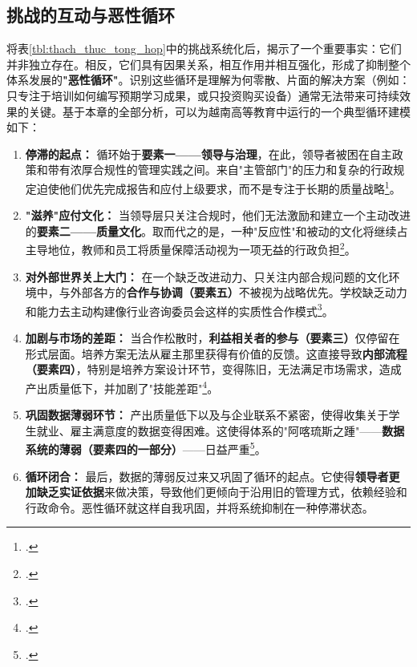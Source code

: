 \subsection{挑战的互动与恶性循环}
\label{subsec:vong_lap_luan_quan}

将表\ref{tbl:thach_thuc_tong_hop}中的挑战系统化后，揭示了一个重要事实：它们并非独立存在。相反，它们具有因果关系，相互作用并相互强化，形成了抑制整个体系发展的\textbf{"恶性循环"}。识别这些循环是理解为何零散、片面的解决方案（例如：只专注于培训如何编写预期学习成果，或只投资购买设备）通常无法带来可持续效果的关键。基于本章的全部分析，可以为越南高等教育中运行的一个典型循环建模如下：

\begin{enumerate}
    \item \textbf{停滞的起点：} 循环始于\textbf{要素一——领导与治理}，在此，领导者被困在自主政策和带有浓厚合规性的管理实践之间。来自"主管部门"的压力和复杂的行政规定迫使他们优先完成报告和应付上级要求，而不是专注于长期的质量战略\footcite{lypham_aosat_2024}。

    \item \textbf{"滋养"应付文化：} 当领导层只关注合规时，他们无法激励和建立一个主动改进的\textbf{要素二——质量文化}。取而代之的是，一种"反应性"和被动的文化将继续占主导地位，教师和员工将质量保障活动视为一项无益的行政负担\footcite{vjol_reactiveculture_2021}。
    
    \item \textbf{对外部世界关上大门：} 在一个缺乏改进动力、只关注内部合规问题的文化环境中，与外部各方的\textbf{合作与协调（要素五）}不被视为战略优先。学校缺乏动力和能力去主动构建像行业咨询委员会这样的实质性合作模式\footcite{buildit_iab_impact}。
    
    \item \textbf{加剧与市场的差距：} 当合作松散时，\textbf{利益相关者的参与（要素三）}仅停留在形式层面。培养方案无法从雇主那里获得有价值的反馈。这直接导致\textbf{内部流程（要素四）}，特别是培养方案设计环节，变得陈旧，无法满足市场需求，造成产出质量低下，并加剧了"技能差距"\footcite{britishcouncil_skills_gap_2021}。
    
    \item \textbf{巩固数据薄弱环节：} 产出质量低下以及与企业联系不紧密，使得收集关于学生就业、雇主满意度的数据变得困难。这使得体系的"阿喀琉斯之踵"——\textbf{数据系统的薄弱（要素四的一部分）}——日益严重\footcite{worldbank_improvingperformance_2020}。
    
    \item \textbf{循环闭合：} 最后，数据的薄弱反过来又巩固了循环的起点。它使得\textbf{领导者更加缺乏实证依据}来做决策，导致他们更倾向于沿用旧的管理方式，依赖经验和行政命令。恶性循环就这样自我巩固，并将系统抑制在一种停滞状态。
\end{enumerate}

